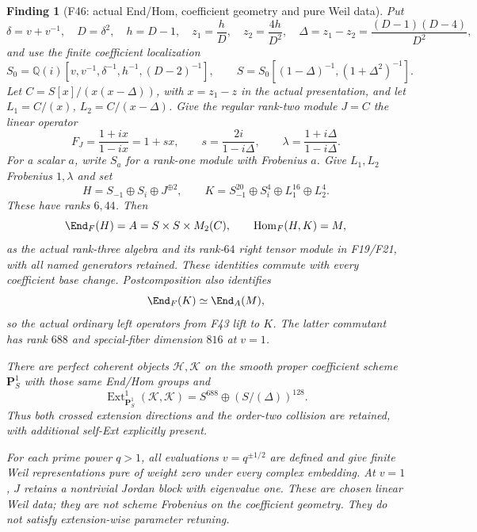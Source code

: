 \documentclass[11pt,a4paper]{article}
\newcommand{\Q}{\mathbb Q}\newcommand{\Z}{\mathbb Z}\newcommand{\C}{\mathbb C}\newcommand{\N}{\mathbb N}\newcommand{\F}{\mathbb F}
\newcommand{\mathscr}{\mathcal}
\newcommand{\fid}[1]{\textsf{#1}}\newcommand{\gate}[1]{\textsf{#1}}
\theoremstyle{named}\newtheorem{finding}{Finding}[section]
\theoremstyle{definition}\newtheorem{definition}[finding]{Definition}
\theoremstyle{remark}\newtheorem{remark}[finding]{Remark}
\begin{document}
\begin{finding}[\fid{F46}: actual End/Hom, coefficient geometry and pure Weil data]\label{f:cayleyweil}
Put
\[
 \delta=v+v^{-1},\quad D=\delta^2,\quad h=D-1,\quad
 z_1=\frac hD,\quad z_2=\frac{4h}{D^2},\quad
 \Delta=z_1-z_2=\frac{(D-1)(D-4)}{D^2},
\]
and use the finite coefficient localization
\[
 S_0=\Q(i)[v,v^{-1},\delta^{-1},h^{-1},(D-2)^{-1}],
 \qquad S=S_0[(1-\Delta)^{-1},(1+\Delta^2)^{-1}].
\]
Let $C=S[x]/(x(x-\Delta))$, with $x=z_1-z$ in the actual
presentation, and let $L_1=C/(x)$, $L_2=C/(x-\Delta)$.
Give the regular rank-two module $J=C$ the linear operator
\[
 F_J=\frac{1+ix}{1-ix}=1+s x,\qquad
 s=\frac{2i}{1-i\Delta},\qquad
 \lambda=\frac{1+i\Delta}{1-i\Delta}.
\]
For a scalar $a$, write $S_a$ for a rank-one module with
Frobenius $a$. Give $L_1,L_2$ Frobenius $1,\lambda$ and set
\[
 H=S_{-1}\oplus S_i\oplus J^{\oplus2},\qquad
 K=S_{-1}^{20}\oplus S_i^4\oplus L_1^{16}\oplus L_2^4.
\]
These have ranks $6,44$. Then
\[
 \End_F(H)=A=S\times S\times M_2(C),\qquad
 \operatorname{Hom}_F(H,K)=M,
\]
as the actual rank-three algebra and its rank-$64$ right tensor
module in \fid{F19}/\fid{F21}, with all named generators retained.
These identities commute with every coefficient base change.
Postcomposition also identifies
\[
 \End_F(K)\simeq\End_A(M),
\]
so the actual ordinary left operators from \fid{F43} lift to $K$.
The latter commutant has rank $688$ and special-fiber dimension
$816$ at $v=1$.

There are perfect coherent objects $\mathscr H,\mathscr K$ on
the smooth proper coefficient scheme $\mathbf P^1_S$ with those
same End/Hom groups and
\[
 \operatorname{Ext}^1_{\mathbf P^1_S}(\mathscr K,\mathscr K)
       =S^{688}\oplus(S/(\Delta))^{128}.
\]
Thus both crossed extension directions and the order-two collision
are retained, with additional self-Ext explicitly present.

For each prime power $q>1$, all evaluations $v=q^{\pm1/2}$ are
defined and give finite Weil representations pure of weight zero
under every complex embedding. At $v=1$, $J$ retains a nontrivial
Jordan block with eigenvalue one. These are chosen linear Weil
data; they are not scheme Frobenius on the coefficient geometry.
They do not satisfy extension-wise parameter retuning.
\end{finding}
\end{document}
